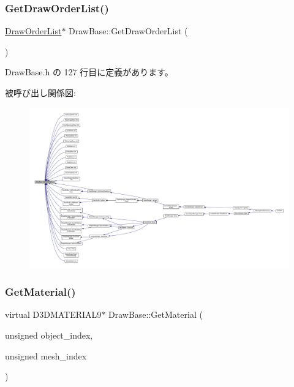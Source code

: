 \subsubsection{\texorpdfstring{Get\+Draw\+Order\+List()}{GetDrawOrderList()}}
{\footnotesize\ttfamily \mbox{\hyperlink{class_draw_order_list}{Draw\+Order\+List}}$\ast$ Draw\+Base\+::\+Get\+Draw\+Order\+List (\begin{DoxyParamCaption}{ }\end{DoxyParamCaption})\hspace{0.3cm}{\ttfamily [inline]}}



 Draw\+Base.\+h の 127 行目に定義があります。

被呼び出し関係図\+:
\nopagebreak
\begin{figure}[H]
\begin{center}
\leavevmode
\includegraphics[width=350pt]{class_draw_base_a894bf875b80745150b250e584f00fa0c_icgraph}
\end{center}
\end{figure}
\mbox{\label{class_draw_base_ad82a75dff8e4e2f2ebbec2dd0d0734e5}} 
\subsubsection{\texorpdfstring{Get\+Material()}{GetMaterial()}}
{\footnotesize\ttfamily virtual D3\+D\+M\+A\+T\+E\+R\+I\+A\+L9$\ast$ Draw\+Base\+::\+Get\+Material (\begin{DoxyParamCaption}\item[{unsigned}]{object\+\_\+index,  }\item[{unsigned}]{mesh\+\_\+index }\end{DoxyParamCaption})\hspace{0.3cm}{\ttfamily [pure virtual]}}



